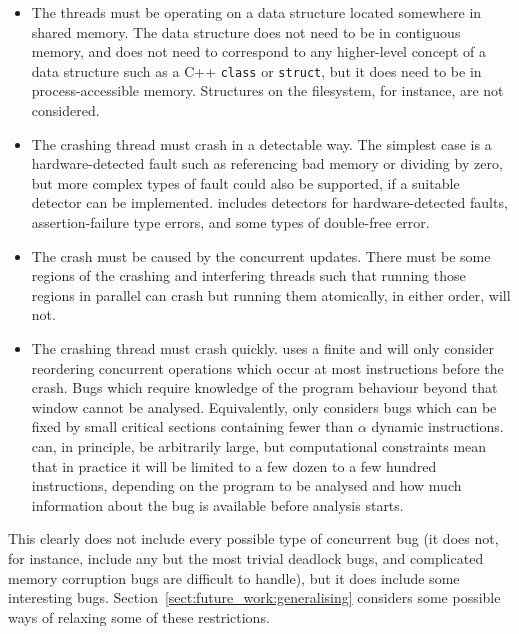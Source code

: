\begin{itemize}
\item The threads must be operating on a data structure located
  somewhere in shared memory.  The data structure does not need to be
  in contiguous memory, and does not need to correspond to any
  higher-level concept of a data structure such as a C++
  \texttt{class} or \texttt{struct}, but it does need to be in
  process-accessible memory.  Structures on the filesystem, for
  instance, are not considered.
\item The crashing thread must crash in a detectable way.  The
  simplest case is a hardware-detected fault such as referencing bad
  memory or dividing by zero, but more complex types of fault could
  also be supported, if a suitable detector can be implemented.
  {\Implementation} includes detectors for hardware-detected faults,
  assertion-failure type errors, and some types of double-free error.
\item The crash must be caused by the concurrent updates.  There must
  be some regions of the crashing and interfering threads such that
  running those regions in parallel can crash but running them
  atomically, in either order, will not.
\item The crashing thread must crash quickly.  {\Technique} uses a
  finite  \introduction{$\alpha$} and
  will only consider reordering concurrent operations which occur at
  most \backref{$\alpha$} instructions before the crash.  Bugs which
  require knowledge of the program behaviour beyond that window cannot
  be analysed.  Equivalently, {\technique} only considers bugs which
  can be fixed by small critical sections containing fewer than
  $\alpha$ dynamic instructions.  \backref{$\alpha$} can, in
  principle, be arbitrarily large, but computational constraints mean
  that in practice it will be limited to a few dozen to a few hundred
  instructions, depending on the program to be analysed and how much
  information about the bug is available before analysis starts.
\end{itemize}

This clearly does not include every possible type of concurrent bug
(it does not, for instance, include any but the most trivial deadlock
bugs, and complicated memory corruption bugs are difficult to handle),
but it does include some interesting bugs.
Section~\ref{sect:future_work:generalising} considers some possible
ways of relaxing some of these restrictions.

